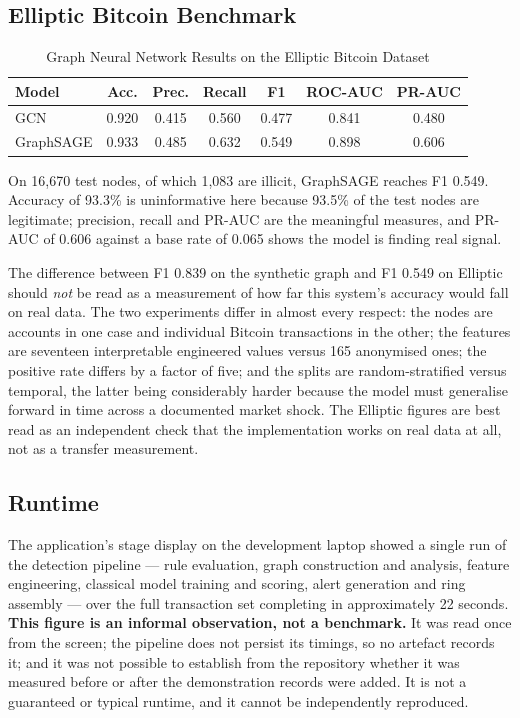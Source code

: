 \subsection{Elliptic Bitcoin Benchmark}
\begin{table}[htbp]
\centering
\caption{Graph Neural Network Results on the Elliptic Bitcoin Dataset}
\label{tab:elliptic}
\small
\begin{tabular}{@{}lcccccc@{}}
\toprule
\textbf{Model} & \textbf{Acc.} & \textbf{Prec.} & \textbf{Recall} & \textbf{F1} & \textbf{ROC-AUC} & \textbf{PR-AUC} \\
\midrule
GCN       & 0.920 & 0.415 & 0.560 & 0.477 & 0.841 & 0.480 \\
GraphSAGE & 0.933 & 0.485 & 0.632 & 0.549 & 0.898 & 0.606 \\
\bottomrule
\end{tabular}
\end{table}

On 16,670 test nodes, of which 1,083 are illicit, GraphSAGE reaches F1 0.549. Accuracy of 93.3\% is uninformative here because 93.5\% of the test nodes are legitimate; precision, recall and PR-AUC are the meaningful measures, and PR-AUC of 0.606 against a base rate of 0.065 shows the model is finding real signal.

The difference between F1 0.839 on the synthetic graph and F1 0.549 on Elliptic should \textit{not} be read as a measurement of how far this system's accuracy would fall on real data. The two experiments differ in almost every respect: the nodes are accounts in one case and individual Bitcoin transactions in the other; the features are seventeen interpretable engineered values versus 165 anonymised ones; the positive rate differs by a factor of five; and the splits are random-stratified versus temporal, the latter being considerably harder because the model must generalise forward in time across a documented market shock. The Elliptic figures are best read as an independent check that the implementation works on real data at all, not as a transfer measurement.

\subsection{Runtime}
The application's stage display on the development laptop showed a single run of the detection pipeline --- rule evaluation, graph construction and analysis, feature engineering, classical model training and scoring, alert generation and ring assembly --- over the full transaction set completing in approximately 22 seconds. \textbf{This figure is an informal observation, not a benchmark.} It was read once from the screen; the pipeline does not persist its timings, so no artefact records it; and it was not possible to establish from the repository whether it was measured before or after the demonstration records were added. It is not a guaranteed or typical runtime, and it cannot be independently reproduced.

